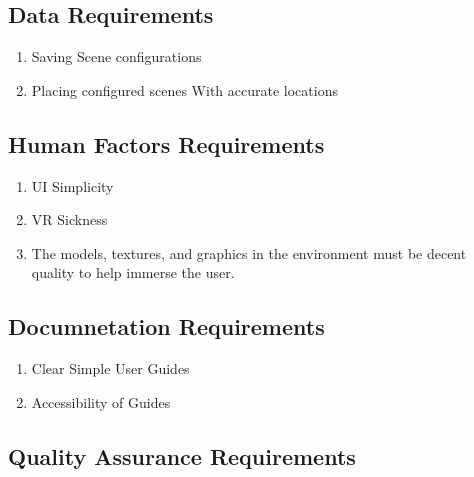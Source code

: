 \documentclass[a4paper,10pt]{article}
\begin{document}
	\subsection{Data Requirements}
	\begin{enumerate}
	 \item Saving Scene configurations
	 \item Placing configured scenes With accurate locations
	\end{enumerate}

	\subsection{Human Factors Requirements}
	\begin{enumerate}
	 \item UI Simplicity
	 \item VR Sickness	 
	 \item The models, textures, and graphics in the environment must be decent quality to help immerse the user.
	 \end{enumerate}
	\subsection{Documnetation Requirements}
	\begin{enumerate}
	 \item Clear Simple User Guides
	 \item Accessibility of Guides
	\end{enumerate}
	\subsection{Quality Assurance Requirements}

	
	
\pagebreak
\end{document}
